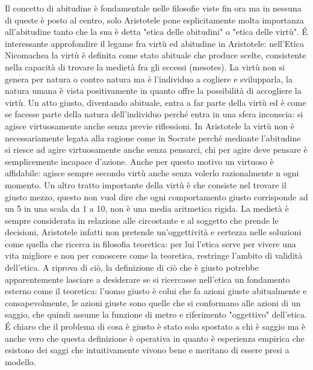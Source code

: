 \documentclass[10pt,a4paper]{article}
\begin{document}
Il concetto di abitudine è fondamentale nelle filosofie viste fin ora ma in nessuna di queste è posto al centro, solo Aristotele pone esplicitamente molta importanza all'abitudine tanto che la sua è detta "etica delle abitudini" o "etica delle virtù". \'E interessante approfondire il legame fra virtù ed abitudine in Aristotele:  nell'Etica Nicomachea la virtù è definita come stato abituale che produce scelte, consistente nella capacità di trovare la medietà fra gli eccessi (mesotes). La virtù non si genera per natura o contro natura ma è l'individuo a cogliere e svilupparla, la natura umana è vista positivamente in quanto offre la possibilità di accogliere la virtù. Un atto giusto, diventando abituale, entra a far parte della virtù ed è come se facesse parte della natura dell'individuo perché entra in una sfera inconscia: si agisce virtuosamente anche senza previe riflessioni. In Aristotele la virtù non è necessariamente legata alla ragione come in Socrate perché mediante l'abitudine si riesce ad agire virtuosamente anche senza pensarci, chi per agire deve pensare è semplicemente incapace d'azione. Anche per questo motivo un virtuoso è affidabile: agisce sempre secondo virtù anche senza volerlo razionalmente n ogni momento. Un altro tratto importante della virtù è che consiste nel trovare il giusto mezzo, questo non vuol dire che ogni comportamento giusto corrisponde ad un 5 in una scala da 1 a 10, non è una media aritmetica rigida. La medietà è sempre considerata in relazione alle circostante e al soggetto che prende le decisioni, Aristotele infatti non pretende un'oggettività e certezza nelle soluzioni come quella che ricerca in filosofia teoretica: per lui l'etica serve per vivere una vita migliore e non per conoscere come la teoretica, restringe l'ambito di validità dell'etica. A riprova di ciò, la definizione di ciò che è giusto potrebbe apparentemente lasciare a desiderare se si ricercasse nell'etica un fondamento esterno come il teoretica: l'uomo giusto è colui che fa azioni giuste abitualmente e consapevolmente, le azioni giuste sono quelle che si conformano alle azioni di un saggio, che quindi assume la funzione di metro e riferimento "oggettivo" dell'etica. \'E chiaro che il problema di cosa è giusto è stato solo spostato a chi è saggio ma è anche vero che questa definizione è operativa in quanto è esperienza empirica che esistono dei saggi che intuitivamente vivono bene e meritano di essere presi a modello. 
\end{document}
